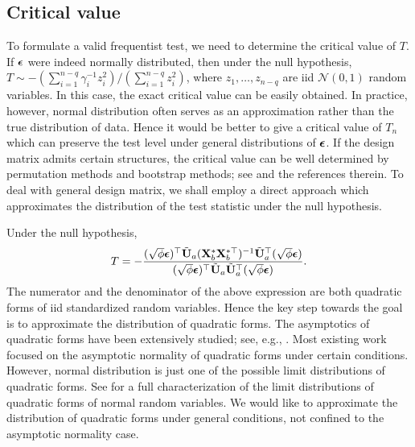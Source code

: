 \documentclass[smallextended]{svjour3}       %
\begin{document}
\subsection{Critical value}
To formulate a valid frequentist test, we need to determine the critical value of $T$.
If $\boldsymbol{\epsilon}$ were indeed normally distributed, then under the null hypothesis,
    $T \sim
    -
    {(\sum_{i=1}^{n-q} \gamma_i^{-1} z_i^2)}/{(\sum_{i=1}^{n-q} z_i^2)}$,
where $z_1,\ldots, z_{n-q}$ are iid $\mathcal N(0,1)$ random variables.
In this case, the exact critical value can be easily obtained.
In practice, however, normal distribution often serves as an approximation rather than the true distribution of data.
Hence it would be better to give a critical value of $T_{n}$ which can preserve the test level under general distributions of $\boldsymbol{\epsilon}$.
If the design matrix admits certain structures, the critical value can be well determined by permutation methods and bootstrap methods; see \cite{Arboretti,Baltagi} and the references therein.
To deal with general design matrix, we shall employ a direct approach which approximates the distribution of the test statistic under the null hypothesis.

Under the null hypothesis,
\begin{equation*}
    T=-\frac{ (\sqrt \phi \boldsymbol{\epsilon})^\top \tilde {\mathbf{U}}_a (\mathbf{X}_b^* \mathbf{X}_b^{*\top})^{-1} \tilde {\mathbf{U}}_a^\top (\sqrt \phi \boldsymbol{\epsilon})}{ (\sqrt \phi \boldsymbol{\epsilon})^\top \tilde {\mathbf{U}}_a  \tilde {\mathbf{U}}_a^\top (\sqrt \phi \boldsymbol{\epsilon})}.
\end{equation*}
The numerator and the denominator of the above expression are both quadratic forms of iid standardized random variables.
Hence the key step towards the goal is to approximate the distribution of quadratic forms.
The asymptotics of quadratic forms have been extensively studied; see, e.g., \cite{Bai2017,Bentkus1996Optimal,Dicker2015Flexible,Goetze2002,jiang1996reml,Jong1987A}.
Most existing work focused on the asymptotic normality of quadratic forms under certain conditions.
However, normal distribution is just one of the possible limit distributions of quadratic forms.
See \cite{Sevast1961A} for a full characterization of the limit distributions of quadratic forms of normal random variables.
We would like to approximate the distribution of quadratic forms under general conditions, not confined to the asymptotic normality case.
\end{document}
